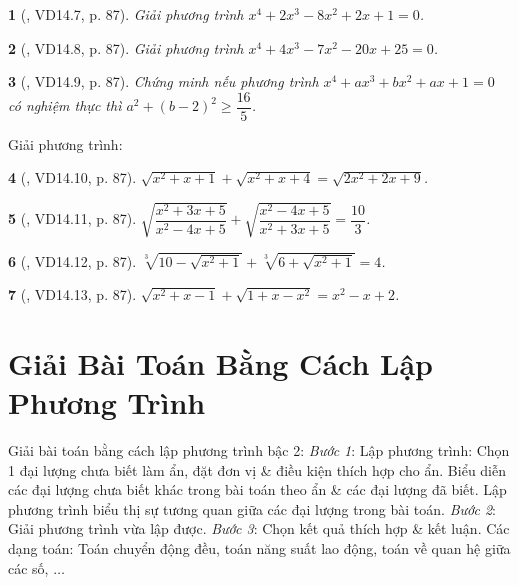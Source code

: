 \documentclass{article}
\newtheorem{baitoan}{}
\begin{document}
\begin{baitoan}[\cite{TLCT_THCS_Toan_9_dai_so}, VD14.7, p. 87]
	Giải phương trình $x^4 + 2x^3 - 8x^2 + 2x + 1 = 0$.
\end{baitoan}

\begin{baitoan}[\cite{TLCT_THCS_Toan_9_dai_so}, VD14.8, p. 87]
	Giải phương trình $x^4 + 4x^3 - 7x^2 - 20x + 25 = 0$.
\end{baitoan}

\begin{baitoan}[\cite{TLCT_THCS_Toan_9_dai_so}, VD14.9, p. 87]
	Chứng minh nếu phương trình $x^4 + ax^3 + bx^2 + ax + 1 = 0$ có nghiệm thực thì $a^2 + (b - 2)^2\ge\dfrac{16}{5}$.
\end{baitoan}
Giải phương trình:
	
\begin{baitoan}[\cite{TLCT_THCS_Toan_9_dai_so}, VD14.10, p. 87]
	$\sqrt{x^2 + x + 1} + \sqrt{x^2 + x + 4} = \sqrt{2x^2 + 2x + 9}$.
\end{baitoan}

\begin{baitoan}[\cite{TLCT_THCS_Toan_9_dai_so}, VD14.11, p. 87]
	$\sqrt{\dfrac{x^2 + 3x + 5}{x^2 - 4x + 5}} + \sqrt{\dfrac{x^2 - 4x + 5}{x^2 + 3x + 5}} = \dfrac{10}{3}$.
\end{baitoan}

\begin{baitoan}[\cite{TLCT_THCS_Toan_9_dai_so}, VD14.12, p. 87]
	$\sqrt[3]{10 - \sqrt{x^2 + 1}} + \sqrt[3]{6 + \sqrt{x^2 + 1}} = 4$.
\end{baitoan}

\begin{baitoan}[\cite{TLCT_THCS_Toan_9_dai_so}, VD14.13, p. 87]
	$\sqrt{x^2 + x - 1} + \sqrt{1 + x - x^2} = x^2 - x + 2$.
\end{baitoan}


\section{Giải Bài Toán Bằng Cách Lập Phương Trình}
 {\sf Giải bài toán bằng cách lập phương trình bậc 2}: \textit{Bước 1}: Lập phương trình: Chọn 1 đại lượng chưa biết làm ẩn, đặt đơn vị \& điều kiện thích hợp cho ẩn. Biểu diễn các đại lượng chưa biết khác trong bài toán theo ẩn \& các đại lượng đã biết. Lập phương trình biểu thị sự tương quan giữa các đại lượng trong bài toán. \textit{Bước 2}: Giải phương trình vừa lập được. \textit{Bước 3}: Chọn kết quả thích hợp \& kết luận.  Các dạng toán: Toán chuyển động đều, toán năng suất lao động, toán về quan hệ giữa các số, $\ldots$
\end{document}
